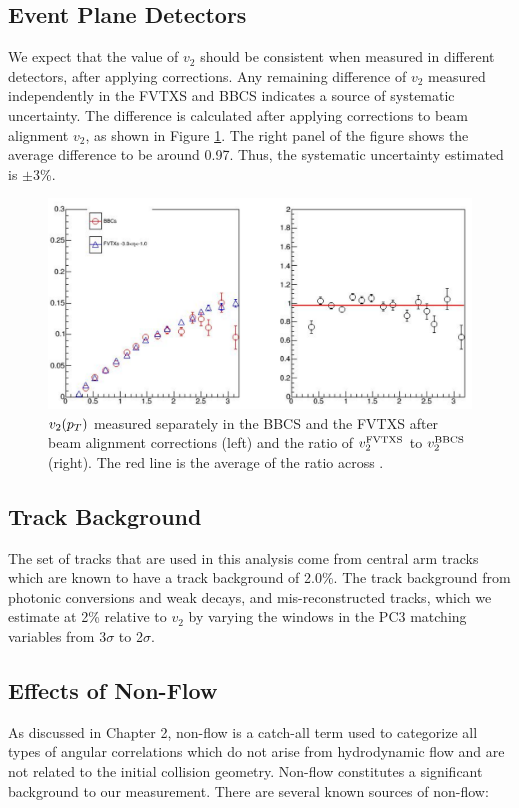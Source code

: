\subsection{Event Plane Detectors}
We expect that the value of $v_2$ should be consistent when measured in different detectors, after applying corrections. Any remaining difference of $v_2$ measured independently in the FVTXS and BBCS indicates a source of systematic uncertainty. The difference is calculated after applying corrections to beam alignment $v_2$, as shown in Figure \ref{fig:v2_fvtx_bbc_compare}. The right panel of the figure shows the average difference to be around 0.97. Thus, the systematic uncertainty estimated is $\pm$3\%.
\begin{figure}[!h]
\begin{center}
\includegraphics[width=0.6\linewidth]{figs/v2_fvtx_bbc_compare_w_correction.png}
\caption{$v_2(\mbox{$p_T$})$ measured separately in the BBCS and the FVTXS after beam alignment corrections (left) and the ratio of $v_2^{\rm FVTXS}$ to $v_2^{\rm BBCS}$ (right). The red line is the average of the ratio across \pt.}
\label{fig:v2_fvtx_bbc_compare}
\end{center}
\end{figure}

\subsection{Track Background}
The set of tracks that are used in this analysis come from central arm tracks which are known to have a track background of 2.0\%. The track background from photonic conversions and weak decays, and mis-reconstructed tracks, which we estimate at 2\% relative to $v_2$ by varying the windows in the PC3 matching variables from 3$\sigma$ to 2$\sigma$.
\subsection{Effects of Non-Flow}
\label{sec:non_flow_intro}
As discussed in Chapter 2, non-flow is a catch-all term used to categorize all types of angular correlations which do not arise from hydrodynamic flow and are not related to the initial collision geometry. Non-flow constitutes a significant background to our measurement. There are several known sources of non-flow:

